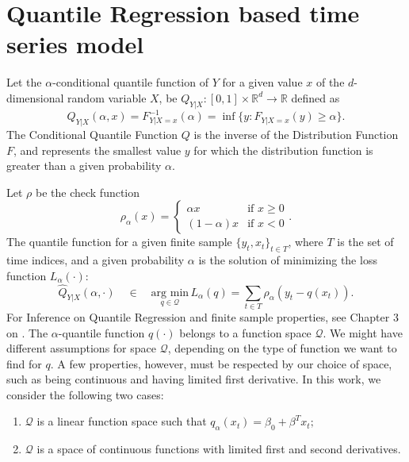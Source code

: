\chapter{Quantile Regression based time series model} \label{sec:qr1}

Let the $\alpha$-conditional quantile function of $Y$ for a given value $x$ of the $d$-dimensional random variable $X$, be $Q_{Y|X}:[0,1] \times \mathbb{R}^d \rightarrow \mathbb{R}$ defined as %
	\begin{equation}
	Q_{Y|X}(\alpha,x) = F_{Y|X=x}^{-1}(\alpha) = \inf\{y: F_{Y|X=x}(y) \geq \alpha\}.
	\label{eq:quantile-function}
	\end{equation}
The Conditional Quantile Function $Q$ is the inverse of the Distribution Function $F$, and represents the smallest value $y$ for which the distribution function is greater than a given probability $\alpha$.

Let $\rho$ be the check function 
	\begin{equation}\label{eq:check-function}
	\rho_{\alpha}(x)=\begin{cases}
	\alpha x & \text{if }x\geq0\\
	(1-\alpha)x & \text{if }x<0
	\end{cases}.
	\end{equation}
The quantile function for a given finite sample $\{y_t,x_t \}_{t \in T}$, where $T$  is the set of time indices, and a given probability $\alpha$ is the solution of minimizing the loss function $L_\alpha(\cdot)$:
	\begin{equation}
	\hat{Q}_{Y|X}(\alpha,\cdot)\quad\in\quad  \underset{q\in\mathcal{Q}}{\text{arg min}}\, L_\alpha(q) = \sum_{t\in T}\rho_{\alpha}(y_{t}-q(x_t)).\label{eq:optim-lqr1} 
	\end{equation}
For Inference on Quantile Regression and finite sample properties, see Chapter 3 on \cite{koenker2005quantile}.
The $\alpha$-quantile function $q(\cdot)$ belongs to a function space $\mathcal{Q}$. We might have different assumptions for space $\mathcal{Q}$, depending on the type of function we want to find 
for $q$. A few properties, however, must be respected by our choice of space, such as being continuous and having limited first derivative. In this work, we consider the following two cases: 
\begin{enumerate}
	\item $\mathcal{Q}$ is a linear function space such that
		$q_\alpha(x_t) = \beta_0 + \beta^T x_t;$ 
	\item $\mathcal{Q}$ is a space of continuous functions with limited first and second derivatives.
\end{enumerate}

